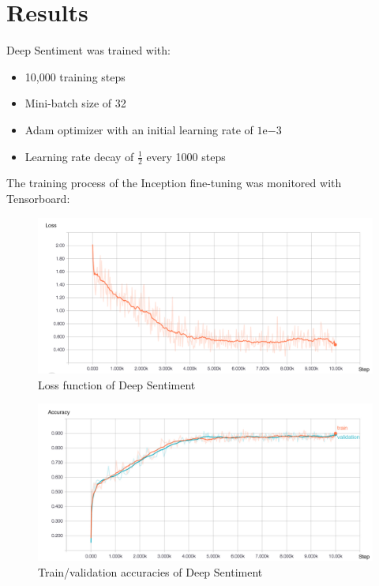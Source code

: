 \section{Results}
Deep Sentiment was trained with:
\begin{itemize}[topsep=0pt]
    \itemsep-1em
    \item 10,000 training steps
    \item Mini-batch size of 32
    \item Adam optimizer with an initial learning rate of $1\mathrm{e}{-3}$
    \item Learning rate decay of $\frac{1}{2}$ every 1000 steps
\end{itemize}

The training process of the Inception fine-tuning was monitored with Tensorboard:
\begin{figure}[H]
    \centering
    \includegraphics[width=\textwidth]{Images/image_text_model_loss_cleaned.jpg}
    \caption{Loss function of Deep Sentiment}
\end{figure}

\begin{figure}[H]
    \centering
    \includegraphics[width=\textwidth]{Images/image_text_model_accuracies_cleaned.jpg}
    \caption{Train/validation accuracies of Deep Sentiment}
\end{figure}

